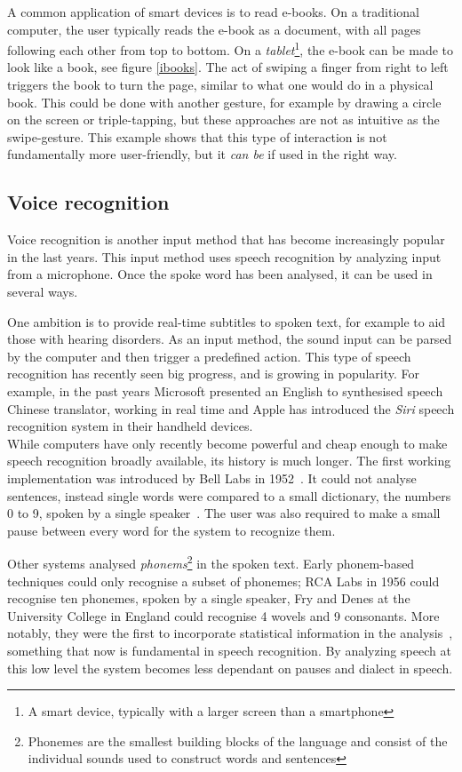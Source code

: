A common application of smart devices is to read e-books. On a traditional computer, the user typically reads the e-book as a document, with all pages following each other from top to bottom. On a \emph{tablet}\footnote{A smart device, typically with a larger screen than a smartphone}, the e-book can be made to look like a book, see figure \ref{ibooks}. The act of swiping a finger from right to left triggers the book to turn the page, similar to what one would do in a physical book. This could be done with another gesture, for example by drawing a circle on the screen or triple-tapping, but these approaches are not as intuitive as the swipe-gesture. This example shows that this type of interaction is not fundamentally more user-friendly, but it \emph{can be} if used in the right way. 

\subsection{Voice recognition}

Voice recognition is another input method that has become increasingly popular in the last years. This input method uses speech recognition by analyzing input from a microphone. Once the spoke word has been analysed, it can be used in several ways.

One ambition is to provide real-time subtitles to spoken text, for example to aid those with hearing disorders. As an input method, the sound input can be parsed by the computer and then trigger a predefined action. This type of speech recognition has recently seen big progress, and is growing in popularity. For example, in the past years Microsoft presented an English to synthesised speech Chinese translator, working in real time and Apple has introduced the \emph{Siri} speech recognition system in their handheld devices.\\

While computers have only recently become powerful and cheap enough to make speech recognition broadly available, its history is much longer. The first working implementation was introduced by Bell Labs in 1952~\cite{Davis52}. It could not analyse sentences, instead single words were compared to a small dictionary, the numbers 0 to 9, spoken by a single speaker~\cite{juang}. The user was also required to make a small pause between every word for the system to recognize them.

Other systems analysed \emph{phonems}\footnote{Phonemes are the smallest building blocks of the language and consist of the individual sounds used to construct words and sentences} in the spoken text. Early phonem-based techniques could only recognise a subset of phonemes; RCA Labs in 1956 could recognise ten phonemes, spoken by a single speaker, Fry and Denes at the University College in England could recognise 4 wovels and 9 consonants. More notably, they were the first to incorporate statistical information in the analysis~\cite{juang}, something that now is fundamental in speech recognition. By analyzing speech at this low level the system becomes less dependant on pauses and dialect in speech.

